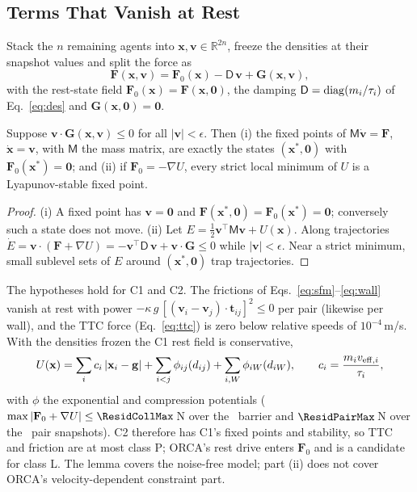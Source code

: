 \subsection{Terms That Vanish at Rest}
Stack the $n$ remaining agents into $\mathbf x,\mathbf v\in\mathbb R^{2n}$, freeze the densities at their snapshot values and split the force as
\begin{equation}\label{eq:split}
\mathbf F(\mathbf x,\mathbf v)=\mathbf F_0(\mathbf x)-\mathsf D\,\mathbf v+\mathbf G(\mathbf x,\mathbf v),
\end{equation}
with the rest-state field $\mathbf F_0(\mathbf x)=\mathbf F(\mathbf x,\mathbf 0)$, the damping $\mathsf D={\rm diag}(m_i/\tau_i)$ of Eq.~\eqref{eq:des} and $\mathbf G(\mathbf x,\mathbf 0)=\mathbf 0$.

\begin{proposition}\label{prop:rest}
Suppose $\mathbf v\cdot\mathbf G(\mathbf x,\mathbf v)\le0$ for all $|\mathbf v|<\epsilon$. Then (i) the fixed points of $\mathsf M\dot{\mathbf v}=\mathbf F$, $\dot{\mathbf x}=\mathbf v$, with $\mathsf M$ the mass matrix, are exactly the states $(\mathbf x^\ast,\mathbf 0)$ with $\mathbf F_0(\mathbf x^\ast)=\mathbf 0$; and (ii) if $\mathbf F_0=-\nabla U$, every strict local minimum of $U$ is a Lyapunov-stable fixed point.
\end{proposition}
\begin{proof}
(i) A fixed point has $\mathbf v=\mathbf 0$ and $\mathbf F(\mathbf x^\ast,\mathbf 0)=\mathbf F_0(\mathbf x^\ast)=\mathbf 0$; conversely such a state does not move. (ii) Let $E=\tfrac12\mathbf v^{\top}\mathsf M\mathbf v+U(\mathbf x)$. Along trajectories $\dot E=\mathbf v\cdot(\mathbf F+\nabla U)=-\mathbf v^{\top}\mathsf D\,\mathbf v+\mathbf v\cdot\mathbf G\le0$ while $|\mathbf v|<\epsilon$. Near a strict minimum, small sublevel sets of $E$ around $(\mathbf x^\ast,\mathbf 0)$ trap trajectories.
\end{proof}

The hypotheses hold for C1 and C2. The frictions of Eqs.~\eqref{eq:sfm}--\eqref{eq:wall} vanish at rest with power $-\kappa\,g\,[(\mathbf v_i-\mathbf v_j)\cdot\mathbf t_{ij}]^2\le0$ per pair (likewise per wall), and the TTC force (Eq.~\eqref{eq:ttc}) is zero below relative speeds of $10^{-4}$\,m/s. With the densities frozen the C1 rest field is conservative,
\begin{equation}\label{eq:U}
U(\mathbf x)=\sum_i c_i\,|\mathbf x_i-\mathbf g|+\sum_{i<j}\phi_{ij}(d_{ij})+\sum_{i,W}\phi_{iW}(d_{iW}),\qquad c_i=\frac{m_iv_{{\rm eff},i}}{\tau_i},
\end{equation}
with $\phi$ the exponential and compression potentials ($\max|\mathbf F_0+\nabla U|\le\ResidCollMax$\,N over the \ResidBarN\ barrier and $\ResidPairMax$\,N over the \ResidPairN\ pair snapshots). C2 therefore has C1's fixed points and stability, so TTC and friction are at most class P; ORCA's rest drive enters $\mathbf F_0$ and is a candidate for class L. The lemma covers the noise-free model; part (ii) does not cover ORCA's velocity-dependent constraint part.

